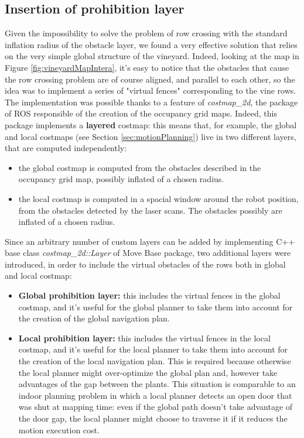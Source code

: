 \subsection{Insertion of prohibition layer}\label{subsec:virtualFences}
Given the impossibility to solve the problem of row crossing with the standard inflation radius of the obstacle layer, we found a very effective solution that relies on the very simple global structure of the vineyard. Indeed, looking at the map in Figure \ref{fig:vineyardMapIntera}, it's easy to notice that the obstacles that cause the row crossing problem are of course aligned, and parallel to each other, so the idea was to implement a series of "virtual fences" corresponding to the vine rows. The implementation was possible thanks to a feature of \textit{costmap\_2d}, the package of \ac{ROS} responsible of the creation of the occupancy grid maps. Indeed, this package implements a \textbf{layered} costmap: this means that, for example, the global and local costmaps (see Section \ref{sec:motionPlanning}) live in two different layers, that are computed independently:
\begin{itemize}
	\item the global costmap is computed from the obstacles described in the occupancy grid map, possibly inflated of a chosen radius.
	\item the local costmap is computed in a spacial window around the robot position, from the obstacles detected by the laser scans. The obstacles possibly are inflated of a chosen radius.
\end{itemize}
Since an arbitrary number of custom layers can be added by implementing C++ base class \textit{costmap\_2d::Layer} of Move Base package, two additional layers were introduced, in order to include the virtual obstacles of the rows both in global and local costmap:
\begin{itemize}
	\item \textbf{Global prohibition layer:} this includes the virtual fences in the global costmap, and it's useful for the global planner to take them into account for the creation of the global navigation plan.
	\item \textbf{Local prohibition layer:} this includes the virtual fences in the local costmap, and it's useful for the local planner to take them into account for the creation of the local navigation plan. This is required because otherwise the local planner might over-optimize the global plan and, however take advantages of the gap between the plants. This situation is comparable to an indoor planning problem in which a local planner detects an open door that was shut at mapping time: even if the global path doesn't take advantage of the door gap, the local planner might choose to traverse it if it reduces the motion execution cost.
\end{itemize}

